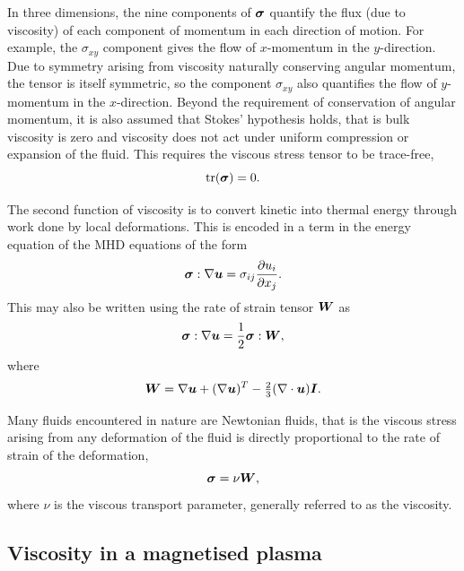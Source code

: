 In three dimensions, the nine components of ${\bm \sigma}$ quantify the flux (due to viscosity) of each component of momentum in each direction of motion. For example, the $\sigma_{xy}$ component gives the flow of $x$-momentum in the $y$-direction. Due to symmetry arising from viscosity naturally conserving angular momentum, the tensor is itself symmetric, so the component $\sigma_{xy}$ also quantifies the flow of $y$-momentum in the $x$-direction. Beyond the requirement of conservation of angular momentum, it is also assumed that Stokes' hypothesis holds, that is bulk viscosity is zero and viscosity does not act under uniform compression or expansion of the fluid. This requires the viscous stress tensor to be trace-free,
\begin{equation}
  \label{eq:trace_free_tensor}
  \text{tr}({\bm \sigma}) = 0.
\end{equation}

The second function of viscosity is to convert kinetic into thermal energy through work done by local deformations. This is encoded in a term in the energy equation of the MHD equations of the form
\begin{equation}
  \label{eq:viscous_heat_generation}
  {\bm \sigma} : \nabla {\bm u} = \sigma_{ij} \frac{\partial u_i}{\partial x_j}.
\end{equation}
This may also be written using the rate of strain tensor ${\bm W}$ as
\begin{equation}
  \label{eq:viscous_heat_generation2}
  {\bm \sigma} : \nabla {\bm u} = \frac{1}{2} {\bm \sigma} : {\bm W},
\end{equation}
where
\begin{equation}
  \label{eq:rate_of_strain}
  {\bm W} = \nabla{\bm u} + (\nabla{\bm u})^T - \tfrac{2}{3}(\nabla \cdot {\bm u}){\bm I}.
\end{equation}

Many fluids encountered in nature are Newtonian fluids, that is the viscous stress arising from any deformation of the fluid is directly proportional to the rate of strain of the deformation,
\begin{equation}
  \label{eq:isotropic_viscous_tensor}
  {\bm \sigma} = \nu {\bm W},
\end{equation}
where $\nu$ is the viscous transport parameter, generally referred to as the viscosity.

\subsection{Viscosity in a magnetised plasma}

